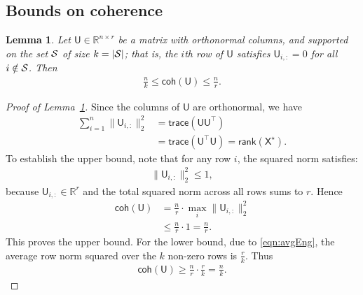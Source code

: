 \documentclass[12pt]{article}
\newtheorem{lemma}{Lemma}
\newcommand{\calS}{{\cal S}}
\newcommand{\s}[1]{\mathsf{#1}}
\begin{document}
\subsection{Bounds on coherence}\label{app:cohereBounds}

\begin{lemma}\label{lem:CohUpLO}
Let $\s{U} \in \mathbb{R}^{n \times r} $ be a matrix with orthonormal columns, and supported on the set $\calS$ of size $k=|\calS|$; that is, the $i$th row of $\mathsf{U}$ satisfies $\mathsf{U}_{i,:} = 0$ for all $i \notin \calS$. Then
\begin{align}
\frac{n}{k}\leq \s{coh}(\s{U})\leq \frac{n}{r}.
\end{align}
\end{lemma}

\begin{proof}[Proof of Lemma~\ref{lem:CohUpLO}]
Since the columns of $ \s{U} $ are orthonormal, we have
\begin{align}
\sum_{i=1}^n \|\s{U}_{i,:}\|_2^2
&= \s{trace}(\s{U}\s{U}^{\top})\\
&= \s{trace}(\s{U}^{\top}\s{U}) = \s{rank}(\s{X}^\star).\label{eqn:avgEng}
\end{align}
To establish the upper bound, note that for any row $ i $, the squared norm satisfies:
\begin{align}
\|  \s{U}_{i,:} \|_2^2 \leq 1,
\end{align}
because $  \s{U}_{i,:} \in \mathbb{R}^r $ and the total squared norm across all rows sums to $ r $. Hence
\begin{align}
\s{coh}(\s{U})& = \frac{n}{r} \cdot \max_{i} \| \s{U}_{i,:} \|_2^2\\
&\leq \frac{n}{r} \cdot 1 = \frac{n}{r}.
\end{align}
This proves the upper bound. For the lower bound, due to \eqref{eqn:avgEng}, the average row norm squared over the $k$ non-zero rows is $\frac{r}{k}$. Thus
\begin{align}
    \s{coh}(\s{U})\geq \frac{n}{r}\cdot\frac{r}{k} = \frac{n}{k}.
\end{align}
\end{proof}
\end{document}

